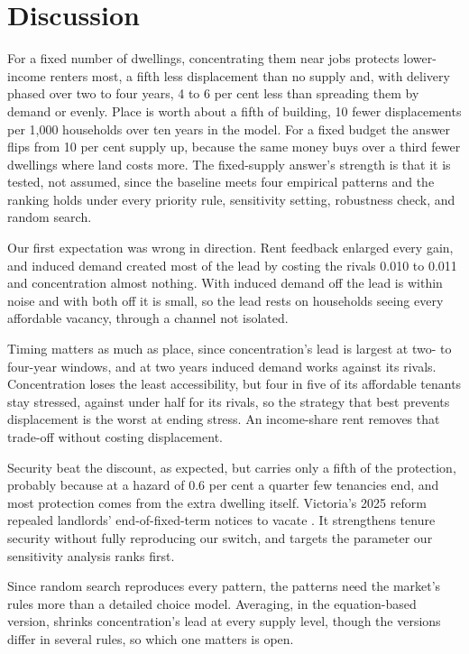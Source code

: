 \documentclass[10pt,a4paper]{article}
\begin{document}
\FloatBarrier
\section*{Discussion}

For a fixed number of dwellings, concentrating them near jobs protects lower-income renters most, a fifth less displacement than no supply and, with delivery phased over two to four years, 4 to 6 per cent less than spreading them by demand or evenly. Place is worth about a fifth of building, 10 fewer displacements per 1,000 households over ten years in the model. For a fixed budget the answer flips from 10 per cent supply up, because the same money buys over a third fewer dwellings where land costs more. The fixed-supply answer's strength is that it is tested, not assumed, since the baseline meets four empirical patterns and the ranking holds under every priority rule, sensitivity setting, robustness check, and random search.

Our first expectation was wrong in direction. Rent feedback enlarged every gain, and induced demand created most of the lead by costing the rivals 0.010 to 0.011 and concentration almost nothing. With induced demand off the lead is within noise and with both off it is small, so the lead rests on households seeing every affordable vacancy, through a channel not isolated.

Timing matters as much as place, since concentration's lead is largest at two- to four-year windows, and at two years induced demand works against its rivals. Concentration loses the least accessibility, but four in five of its affordable tenants stay stressed, against under half for its rivals, so the strategy that best prevents displacement is the worst at ending stress. An income-share rent removes that trade-off without costing displacement.

Security beat the discount, as expected, but carries only a fifth of the protection, probably because at a hazard of 0.6 per cent a quarter few tenancies end, and most protection comes from the extra dwelling itself. Victoria's 2025 reform repealed landlords' end-of-fixed-term notices to vacate \citep{34}. It strengthens tenure security without fully reproducing our switch, and targets the parameter our sensitivity analysis ranks first.

Since random search reproduces every pattern, the patterns need the market's rules more than a detailed choice model. Averaging, in the equation-based version, shrinks concentration's lead at every supply level, though the versions differ in several rules, so which one matters is open.
\end{document}
